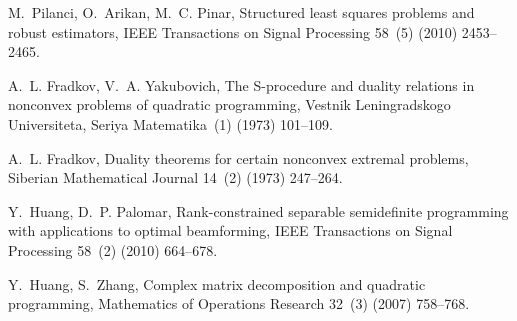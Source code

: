 \documentclass[review,sort&compress]{elsarticle}
\begin{document}
\begin{thebibliography}{10}
M.~Pilanci, O.~Arikan, M.~C. Pinar, Structured least squares problems and
  robust estimators, IEEE Transactions on Signal Processing 58~(5) (2010)
  2453--2465.

A.~L. Fradkov, V.~A. Yakubovich, The {S}-procedure and duality relations in
  nonconvex problems of quadratic programming, Vestnik Leningradskogo
  Universiteta, Seriya Matematika~(1) (1973) 101--109.

A.~L. Fradkov, Duality theorems for certain nonconvex extremal problems,
  Siberian Mathematical Journal 14~(2) (1973) 247--264.

Y.~Huang, D.~P. Palomar, Rank-constrained separable semidefinite programming
  with applications to optimal beamforming, IEEE Transactions on Signal
  Processing 58~(2) (2010) 664--678.

Y.~Huang, S.~Zhang, Complex matrix decomposition and quadratic programming,
  Mathematics of Operations Research 32~(3) (2007) 758--768.

\end{thebibliography}
\end{document}
